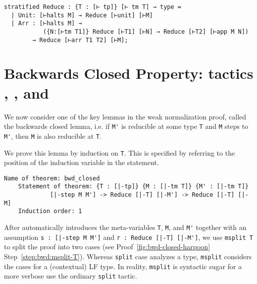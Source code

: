 \begin{lstlisting}
stratified Reduce : {T : [⊢ tp]} [⊢ tm T] → type =
  | Unit: [⊢halts M] → Reduce [⊢unit] [⊢M]
  | Arr : [⊢halts M] →
           ({N:[⊢tm T1]} Reduce [⊢T1] [⊢N] → Reduce [⊢T2] [⊢app M N])
        → Reduce [⊢arr T1 T2] [⊢M];
\end{lstlisting}

\section{%
  Backwards Closed Property: tactics \ttmsplit, \ttsuffices, and \ttby%
}

We now consider one of the key lemmas in the weak normalization proof,
called the backwards closed lemma, i.e.  if \lstinline!M'! is
reducible at some type \lstinline!T! and \lstinline!M! steps to
\lstinline!M'!, then \lstinline!M! is also reducible at \lstinline!T!.

We prove this lemma by induction on \lstinline!T!. This is
specified by referring to the position of the induction variable in
the statement.

\begin{lstlisting}[gobble=2, deletekeywords={of}]
    Name of theorem: bwd_closed
    Statement of theorem: {T : [|-tp]} {M : [|-tm T]} {M' : [|-tm T]}
             [|-step M M'] -> Reduce [|-T] [|-M'] -> Reduce [|-T] [|-M]
    Induction order: 1
\end{lstlisting}

%
After \Harpoon{} automatically
introduces the meta-variables \lstinline!T!, \lstinline!M!,
and \lstinline!M'! together with an assumption
\lstinline!s : [|-step M M']! and \lstinline!r : Reduce [|-T] [|-M']!,
we use \lstinline!msplit T! to split the proof into two cases (see
\Harpoon{} Proof~\ref{fig:bwd-closed-harpoon}
Step~\ref{step:bwd:msplit-T}). Whereas \lstinline!split! case analyzes
a \Beluga{} type, \lstinline!msplit! considers the cases for a
(contextual) LF type. In reality, \lstinline!msplit! is syntactic sugar for a
more verbose use the ordinary \lstinline!split! tactic.


